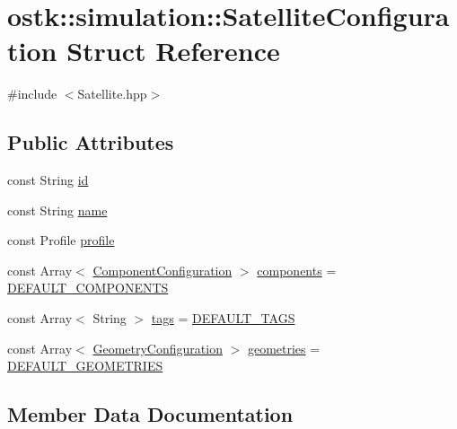 \hypertarget{structostk_1_1simulation_1_1_satellite_configuration}{}\section{ostk\+:\+:simulation\+:\+:Satellite\+Configuration Struct Reference}
\label{structostk_1_1simulation_1_1_satellite_configuration}


{\ttfamily \#include $<$Satellite.\+hpp$>$}

\subsection*{Public Attributes}
\begin{DoxyCompactItemize}
\item 
const String \hyperlink{structostk_1_1simulation_1_1_satellite_configuration_a908266db30927a86a162c7c8a73bdbe1}{id}
\item 
const String \hyperlink{structostk_1_1simulation_1_1_satellite_configuration_a5591546d238904643014391632e95073}{name}
\item 
const Profile \hyperlink{structostk_1_1simulation_1_1_satellite_configuration_ab2afb3f9823e69021f909495fb74ca3f}{profile}
\item 
const Array$<$ \hyperlink{structostk_1_1simulation_1_1_component_configuration}{Component\+Configuration} $>$ \hyperlink{structostk_1_1simulation_1_1_satellite_configuration_a44d10b5d983f71491e0751a0c1ac5f80}{components} = \hyperlink{_satellite_8hpp_a4efe76b184101f122bb1be222cb65afc}{D\+E\+F\+A\+U\+L\+T\+\_\+\+C\+O\+M\+P\+O\+N\+E\+N\+TS}
\item 
const Array$<$ String $>$ \hyperlink{structostk_1_1simulation_1_1_satellite_configuration_a6db145a39cbb82053013b7ee92dcc326}{tags} = \hyperlink{_satellite_8hpp_a7cabb8538f234177d4f95e681045bf94}{D\+E\+F\+A\+U\+L\+T\+\_\+\+T\+A\+GS}
\item 
const Array$<$ \hyperlink{structostk_1_1simulation_1_1component_1_1_geometry_configuration}{Geometry\+Configuration} $>$ \hyperlink{structostk_1_1simulation_1_1_satellite_configuration_aea05ae6081923cf5c9502bd176b756b9}{geometries} = \hyperlink{_satellite_8hpp_a4a68d11996a67b508045cdc894fac4ba}{D\+E\+F\+A\+U\+L\+T\+\_\+\+G\+E\+O\+M\+E\+T\+R\+I\+ES}
\end{DoxyCompactItemize}


\subsection{Member Data Documentation}
\mbox{\label{structostk_1_1simulation_1_1_satellite_configuration_a44d10b5d983f71491e0751a0c1ac5f80}} 
